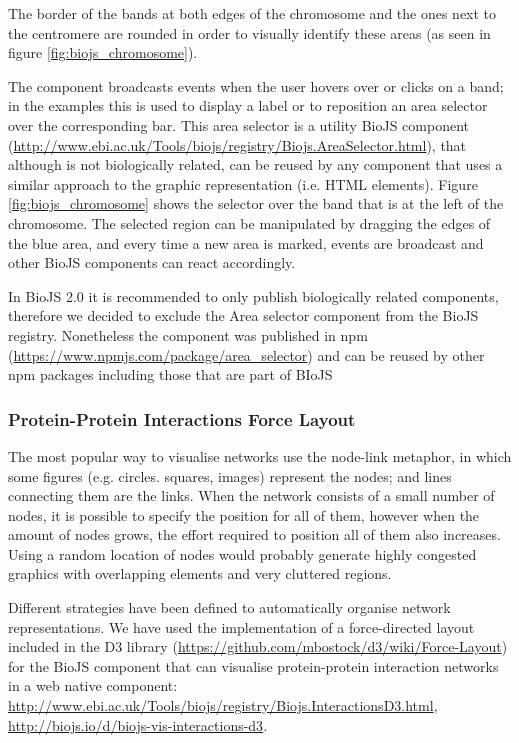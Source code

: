 The border of the bands at both edges of the chromosome and the ones next to the centromere are rounded in order to visually identify these areas (as seen in figure \ref{fig:biojs_chromosome}).

The component broadcasts events when the user hovers over or clicks on a band; in the examples this is used to display a label or to reposition an area selector over the corresponding bar. This area selector is a utility BioJS component (\url{http://www.ebi.ac.uk/Tools/biojs/registry/Biojs.AreaSelector.html}), that although is not biologically related,  can be reused by any component that uses a similar approach to the graphic representation (i.e. HTML elements). Figure \ref{fig:biojs_chromosome} shows the selector over the band that is at the left of the chromosome. The selected region can be manipulated by dragging the edges of the blue area, and every time a new area is marked, events are broadcast and other BioJS components can react accordingly.

In BioJS 2.0 it is recommended to only publish biologically related components, therefore we decided to exclude the Area selector component from the BioJS registry. Nonetheless the component was published in npm (\url{https://www.npmjs.com/package/area_selector}) and can be reused by other npm packages including those that are part of BIoJS
 
\subsubsection{Protein-Protein Interactions Force Layout} \label{subsubsec:ppi_biojs}
The most popular way to visualise networks use the node-link metaphor, in which some figures (e.g. circles. squares, images) represent the nodes; and lines connecting them are the links. When the network consists of a small number of nodes, it is possible to specify the position for all of them, however when the amount of nodes grows, the effort required to position all of them also increases. Using a random location of nodes would probably generate highly congested graphics with overlapping elements and very cluttered regions.

Different strategies have been defined to automatically organise network representations. We have used the implementation of a force-directed layout included in the D3 library (\url{https://github.com/mbostock/d3/wiki/Force-Layout}) \cite{BOS2011} for the BioJS component that can visualise protein-protein interaction networks in a web native component:  \url{http://www.ebi.ac.uk/Tools/biojs/registry/Biojs.InteractionsD3.html}, \url{http://biojs.io/d/biojs-vis-interactions-d3}.

